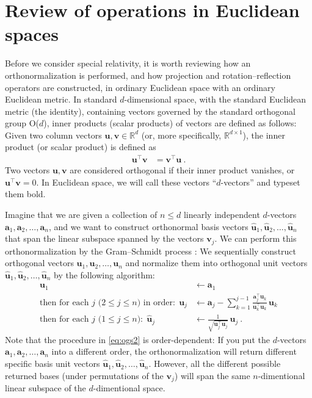\documentclass{article}
\newcommand{\Evec}[1]{{\mathbf{#1}}} %
\newcommand{\Ehat}[1]{{\mathbf{\hat{#1}}}} %
\begin{document}
\section{Review of operations in Euclidean spaces}\label{sec:od}

Before we consider special relativity, it is worth reviewing how an orthonormalization is performed, and how projection and rotation--reflection operators are constructed, in ordinary Euclidean space with an ordinary Euclidean metric.
In standard $d$-dimensional space, with the standard Euclidean metric (the identity), containing vectors governed by the standard orthogonal group O($d$), inner products (scalar products) of vectors are defined as follows:
Given two column vectors $\Evec{u},\Evec{v}\in\mathbb{R}^d$ (or, more specifically, $\mathbb{R}^{d\times1}$), the inner product (or scalar product) is defined as
\begin{align}
    \Evec{u}^\top \Evec{v} &= \Evec{v}^\top \Evec{u} ~.
\end{align}
Two vectors $\Evec{u},\Evec{v}$ are considered orthogonal if their inner product vanishes, or $\Evec{u}^\top\Evec{v}=0$.
In Euclidean space, we will call these vectors ``$d$-vectors'' and typeset them bold.

Imagine that we are given a collection of $n\leq d$ linearly independent $d$-vectors $\Evec{a}_1,\Evec{a}_2,\ldots,\Evec{a}_n$,
and we want to construct orthonormal basis vectors $\Ehat{u}_1,\Ehat{u}_2,\ldots,\Ehat{u}_n$ that span the linear subspace spanned by the vectors $\Evec{v}_j$.
We can perform this orthonormalization by the Gram--Schmidt process \cite{gramschmidt}:
We sequentially construct orthogonal vectors $\Evec{u}_1,\Evec{u}_2,\ldots,\Evec{u}_n$ and normalize them into orthogonal unit vectors $\Ehat{u}_1,\Ehat{u}_2,\ldots,\Ehat{u}_n$ by the following algorithm:
\begin{align}
    \Evec{u}_1 &\leftarrow \Evec{a}_1 \label{eq:ogs1}
    \\
    \mbox{then for each $j$ ($2\leq j\leq n$) in order:} ~~ \Evec{u}_j &\leftarrow \Evec{a}_j - \sum_{k=1}^{j-1} \frac{\Evec{a}_j^\top\Evec{u}_k}{\Evec{u}_k^\top\Evec{u}_k}\,\Evec{u}_k \label{eq:ogs2}
    \\
    \mbox{then for each $j$ ($1\leq j\leq n$):} ~~ \Ehat{u}_j &\leftarrow \frac{1}{\sqrt{\Evec{u}_j^\top\Evec{u}_j}}\,\Evec{u}_j ~. \label{eq:ogs3}
\end{align}
Note that the procedure in \eqref{eq:ogs2} is order-dependent: If you put the $d$-vectors $\Evec{a}_1,\Evec{a}_2,\ldots,\Evec{a}_n$ into a different order, the orthonormalization will return different specific basis unit vectors $\Ehat{u}_1,\Ehat{u}_2,\ldots,\Ehat{u}_n$.
However, all the different possible returned bases (under permutations of the $\Evec{v}_j$) will span the same $n$-dimentional linear subspace of the $d$-dimentional space.
\end{document}
